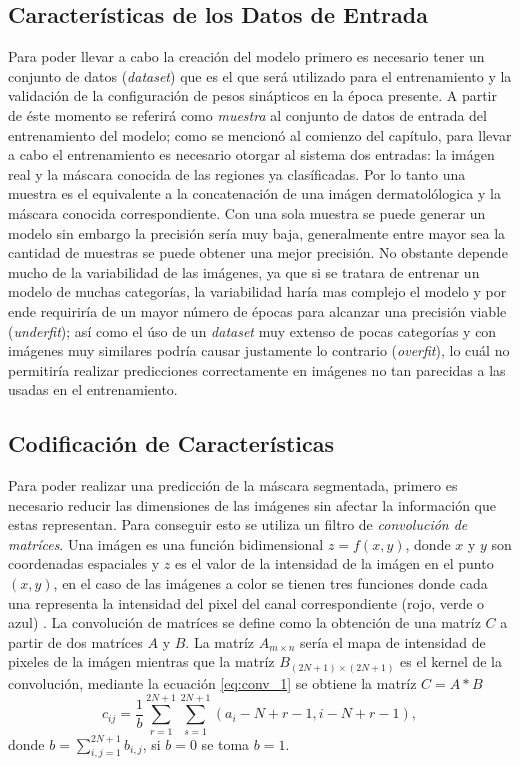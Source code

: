\subsection{Características de los Datos de Entrada}
Para poder llevar a cabo la creación del modelo primero es necesario tener un conjunto de datos (\emph{dataset}) que es el que será utilizado para el entrenamiento y la validación de la configuración de pesos sinápticos en la época presente.
A partir de éste momento se referirá como \emph{muestra} al conjunto de datos de entrada del entrenamiento del modelo; como se mencionó al comienzo del capítulo, para llevar a cabo el entrenamiento es necesario otorgar al sistema dos entradas: la imágen real y la máscara conocida de las regiones ya clasíficadas. Por lo tanto una muestra es el equivalente a la concatenación de una imágen dermatolólogica y la máscara conocida correspondiente. Con una sola muestra se puede generar un modelo sin embargo la precisión sería muy baja, generalmente entre mayor sea la cantidad de muestras se puede obtener una mejor precisión. No obstante depende mucho de la variabilidad de las imágenes, ya que si se tratara de entrenar un modelo de muchas categorías, la variabilidad haría mas complejo el modelo y por ende requiriría de un mayor número de épocas para alcanzar una precisión viable (\emph{underfit}); así como el úso de un \emph{dataset} muy extenso de pocas categorías y con imágenes muy similares podría causar justamente lo contrario (\emph{overfit}), lo cuál no permitiría realizar predicciones correctamente en imágenes no tan parecidas a las usadas en el entrenamiento.

\subsection{Codificación de Características}
Para poder realizar una predicción de la máscara segmentada, primero es necesario reducir las dimensiones de las imágenes sin afectar la información que estas representan. Para conseguir esto se utiliza un filtro de \emph{convolución de matríces}. Una imágen es una función bidimensional $ z = f(x,y)$, donde $x$ y $y$ son coordenadas espaciales y $z$ es el valor de la intensidad de la imágen en el punto $(x , y)$, en el caso de las imágenes a color se tienen tres funciones donde cada una representa la intensidad del pixel del canal correspondiente (rojo, verde o azul) \citep[~p. 100]{conv_1}. La convolución de matríces se define como la obtención de una matríz $C$ a partir de dos matríces $A$ y $B$. La matríz $A_{m \times n}$ sería el mapa de intensidad de pixeles de la imágen mientras que la matríz $B_{(2N+1) \times (2N+1)}$ es el kernel de la convolución, mediante la ecuación \ref{eq:conv_1} se obtiene la matríz $C = A * B$
\begin{equation}
c_{ij} = \frac{1}{b} \sum_{r=1}^{2N+1}\sum_{s=1}^{2N+1}(a_i-N+r-1, i-N+r-1),
\label{eq:conv_1}
\end{equation}
donde $b = \sum_{i,j=1}^{2N+1} b_{i,j}$, si $b=0$ se toma $b=1$.

